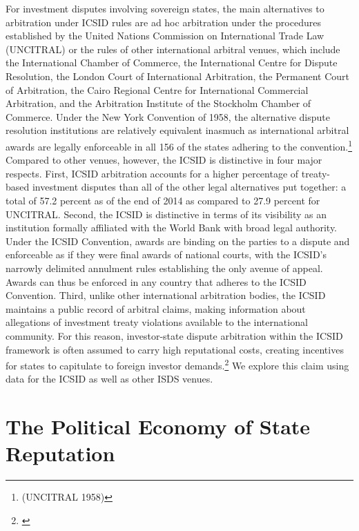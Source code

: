 \documentclass[12pt,onesided]{amsart}
\begin{document}
For investment disputes involving sovereign states, the main alternatives to arbitration under ICSID rules are ad hoc arbitration under the procedures established by the United Nations Commission on International Trade Law (UNCITRAL) or the rules of other international arbitral venues, which include the International Chamber of Commerce, the International Centre for Dispute Resolution, the London Court of International Arbitration, the Permanent Court of Arbitration, the Cairo Regional Centre for International Commercial Arbitration, and the Arbitration Institute of the Stockholm Chamber of Commerce. Under the New York Convention of 1958,  the alternative dispute resolution institutions are relatively equivalent inasmuch as international arbitral awards are legally enforceable in all 156 of the states adhering to the convention.\footnote{(UNCITRAL 1958)} Compared to other venues, however, the ICSID is distinctive in four major respects. First,  ICSID arbitration accounts for a higher percentage of treaty-based investment disputes than all of the other legal alternatives put together: a total of 57.2 percent as of the end of 2014 as compared to 27.9 percent for UNCITRAL. Second, the ICSID is distinctive in terms of its visibility as an institution formally affiliated with the World Bank with broad legal authority. Under the ICSID Convention, awards are binding on the parties to a dispute and enforceable as if they were final awards of national courts, with the ICSID's narrowly delimited annulment rules establishing the only avenue of appeal. Awards can thus be enforced in any country that adheres to the ICSID Convention. Third, unlike other international arbitration bodies, the ICSID maintains a public record of arbitral claims, making information about allegations of investment treaty violations available to the international community. For this reason, investor-state dispute arbitration within the ICSID framework is often assumed to carry high reputational costs, creating incentives for states to capitulate to foreign investor demands.\footnote{\citet[p. 619]{trakman:2013}}  We explore this claim using data for the ICSID as well as other ISDS venues.

\section*{The Political Economy of State Reputation}
\end{document}
